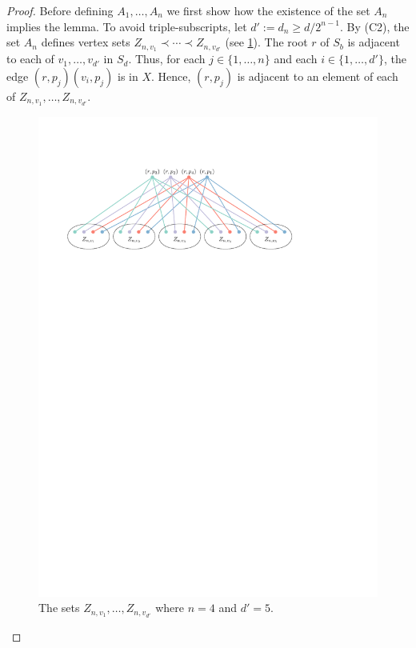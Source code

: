 \documentclass[kpfonts]{patmorin}
\renewcommand{\ge}{\geqslant}
\begin{document}
\begin{proof}
    Before defining $A_1,\ldots,A_n$ we first show how the existence of the set $A_n$ implies the lemma.  To avoid triple-subscripts, let $d':=d_n\ge d/2^{n-1}$. By (C2), the set $A_n$ defines vertex sets $Z_{n,v_1}\prec\cdots\prec Z_{n,v_{d'}}$ (see \cref{fig_twister}). The root $r$ of $S_b$ is adjacent to each of $v_{1},\ldots,v_{d'}$ in $S_d$. Thus, for each $j\in\{1,\ldots,n\}$ and each $i\in\{1,\ldots,d'\}$, the edge $(r,p_j)(v_i,p_j)$ is in $X$. Hence, $(r,p_j)$ is adjacent to an element of each of $Z_{n,v_1},\ldots,Z_{n,v_{d'}}$.
	\begin{figure}[!h]
		\centering\includegraphics{figs/twister}
		\caption{The sets $Z_{n,v_1},\ldots,Z_{n,v_{d'}}$ where $n=4$ and $d'=5$.}
		\label{fig_twister}
	\end{figure}


\end{proof}
\end{document}
